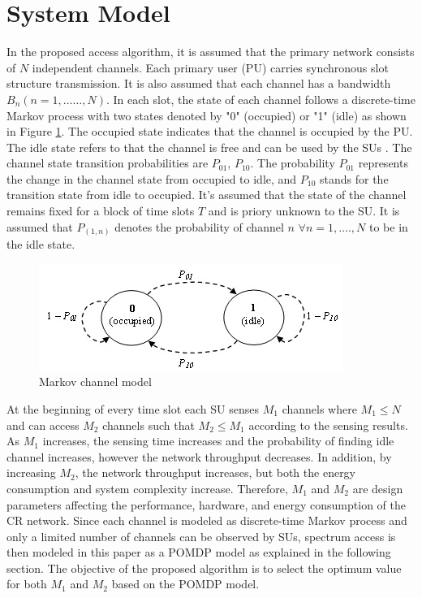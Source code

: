 \documentclass[twocolumn]{el-author}
\begin{document}
\section{System Model}
In the proposed access algorithm, it is assumed that the primary network consists of $N$ independent channels. Each primary user (PU) carries synchronous slot structure transmission. It is also assumed that each channel has a bandwidth $B_n (n=1,\dots \dots ,N)$.  In each slot, the state of each channel follows a discrete-time Markov process with two states denoted by "0" (occupied) or "1" (idle) as shown in Figure \ref{fig:pomdp}. The occupied state indicates that the channel is occupied by the PU. The idle state refers to that the channel is free and can be used by the SUs \cite{Choi2011,Masrub2012,Zhao2007,FarragSayed2017}. The channel state transition probabilities are $P_{01}$, $P_{10}$. The probability $P_{01}$ represents the change in the channel state from occupied to idle, and $P_{10}$ stands for the transition state from idle to occupied. It's assumed that the state of the channel remains fixed for a block of time slots $T$ and is priory unknown to the SU. It is assumed that $P_{(1,n)}$ denotes the probability of channel $n$  $ \forall {n=1,\dots .,N}$ to be in the idle state.
\begin{figure}[h]
\centering
\includegraphics[width=0.5\columnwidth]{./pomdp.jpg}
\caption{Markov channel model}
\label{fig:pomdp}
\end{figure}

At the beginning of every  time slot each SU senses $M_1$ channels where $M_1 \le N$ and can access $M_2$ channels such that $M_2\le M_1$ according to the sensing results. As $M_1$ increases, the sensing time increases and the probability of finding idle channel increases, however the network throughput decreases. In addition, by increasing $M_2$, the network throughput increases, but both the energy consumption and system complexity increase. Therefore, $M_1$ and $M_2$ are design parameters affecting the performance, hardware, and energy consumption of the CR network. Since each channel is modeled as discrete-time Markov process and only a limited number of channels can be observed by SUs, spectrum access is then modeled in this paper as a POMDP model as explained in the following section. The objective of the proposed algorithm is to select the optimum value for both $M_1$ and $M_2$ based on the POMDP model. 
%
\end{document}
